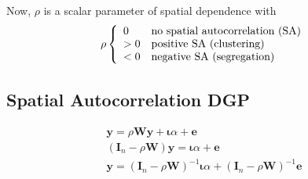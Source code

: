 Now, $\rho$ is a scalar parameter of spatial dependence with
\begin{eqnarray}
\rho
 \left\{ 
  \begin{array}{l l}
    0 & \text{no spatial autocorrelation (SA)}\\
    > 0 & \text{positive SA (clustering)}\\
    < 0 & \text{negative SA (segregation)}
  \end{array} 
 \right. %
\end{eqnarray}

\subsection{Spatial Autocorrelation DGP}
\begin{eqnarray}
\boldsymbol{y} = \rho\boldsymbol{W}\boldsymbol{y} + \boldsymbol{\iota}\alpha + \boldsymbol{e}\\
(\boldsymbol{I}_n - \rho\boldsymbol{W})\boldsymbol{y} = \boldsymbol{\iota}\alpha + \boldsymbol{e}\\
\boldsymbol{y} = (\boldsymbol{I}_n - \rho\boldsymbol{W})^{-1}\boldsymbol{\iota}\alpha + (\boldsymbol{I}_n - \rho\boldsymbol{W})^{-1}\boldsymbol{e}
\end{eqnarray}

